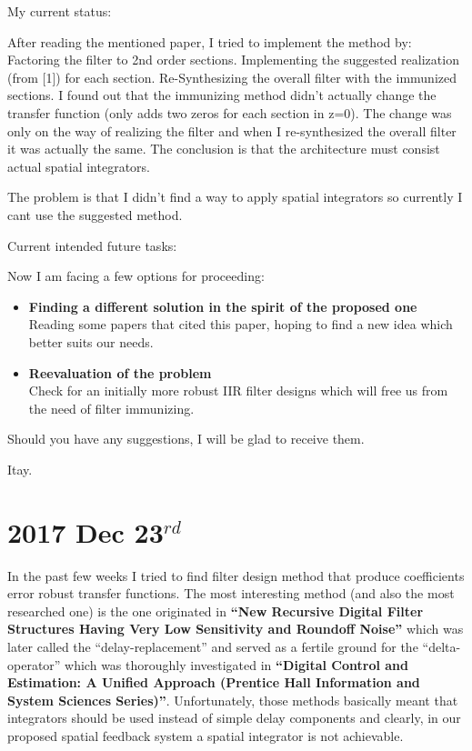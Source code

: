 \documentclass[12pt]{article}
\begin{document}
\begin{mdframed}
My current status:

After reading the mentioned paper, I tried to implement the method by:
Factoring the filter to 2nd order sections.
Implementing the suggested realization (from [1]) for each section.
Re-Synthesizing the overall filter with the immunized sections.
I found out that the immunizing method didn't actually change the transfer function (only adds two zeros for each section in z=0).
The change was only on the way of realizing the filter and when I re-synthesized the overall filter it was actually the same.
The conclusion is that the architecture must consist actual spatial integrators.  
 
The problem is that I didn't find a way to apply spatial integrators so currently I cant use the suggested method.

Current intended future tasks:

Now I am facing a few options for proceeding:
\begin{itemize}
\item{
\textbf{Finding a different solution in the spirit of the proposed one}
\\
Reading some papers that cited this paper, hoping to find a new idea which better suits our needs.
}
\item{
\textbf{Reevaluation of the problem}
\\
Check for an initially more robust IIR filter designs which will free us from the need of filter immunizing.
}
\end{itemize}

Should you have any suggestions, I will be glad to receive them.

Itay.
\end{mdframed}

\section{2017 Dec 23$^{rd}$}
In the past few weeks I tried to find filter design method that produce coefficients error robust transfer functions. The most interesting method (and also the most researched one) is the one originated in \cite{Agarwal1975NewNoise} \textbf{``New Recursive Digital Filter Structures Having Very Low Sensitivity and Roundoff Noise''} which was later called the ``delay-replacement'' and served as a fertile ground for the ``delta-operator'' which was thoroughly investigated in \cite{MiddletonRichardHandGoodwin1990DigitalSeries} \textbf{``Digital Control and Estimation: A Unified Approach (Prentice Hall Information and System Sciences Series)''}. Unfortunately, those methods basically meant that integrators should be used instead of simple delay components and clearly, in our proposed spatial feedback system a spatial integrator is not achievable.
\end{document}
